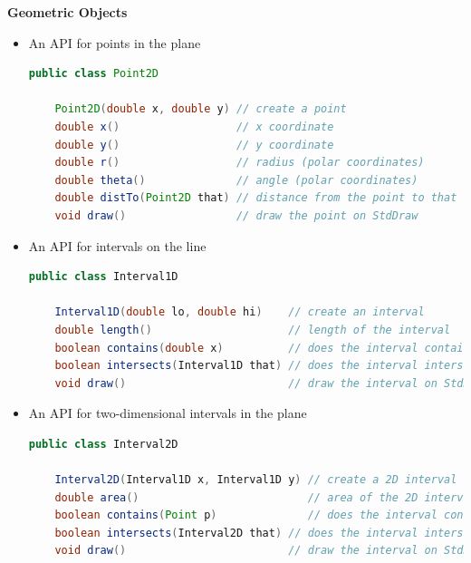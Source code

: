 \documentclass[8pt,a4paper,compress]{beamer}
\begin{document}
\begin{frame}[fragile]
\pause

\textbf{Geometric Objects} 
\begin{itemize}
\pause

\item An API for points in the plane
\begin{lstlisting}[language=Java]
public class Point2D

    Point2D(double x, double y) // create a point
    double x()                  // x coordinate
    double y()                  // y coordinate
    double r()                  // radius (polar coordinates)
    double theta()              // angle (polar coordinates)
    double distTo(Point2D that) // distance from the point to that
    void draw()                 // draw the point on StdDraw
\end{lstlisting}

\pause

\item An API for intervals on the line
\begin{lstlisting}[language=Java]
public class Interval1D

    Interval1D(double lo, double hi)    // create an interval
    double length()                     // length of the interval
    boolean contains(double x)          // does the interval contain x?
    boolean intersects(Interval1D that) // does the interval intersect that?
    void draw()                         // draw the interval on StdDraw          
\end{lstlisting}

\pause

\item An API for two-dimensional intervals in the plane
\begin{lstlisting}[language=Java]
public class Interval2D
          
    Interval2D(Interval1D x, Interval1D y) // create a 2D interval
    double area()                          // area of the 2D interval 
    boolean contains(Point p)              // does the interval contain p?
    boolean intersects(Interval2D that) // does the interval intersect that?
    void draw()                         // draw the interval on StdDraw
\end{lstlisting}
\end{itemize}
\end{frame}
\end{document}
